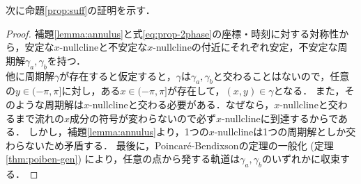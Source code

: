 \documentclass[../main]{subfiles}
\begin{document}
    次に命題\ref{prop:suff}の証明を示す．
    \begin{proof}
        補題\ref{lemma:annulus}と式\eqref{eq:prop-2phase}の座標・時刻に対する対称性から，安定な$x$-nullclineと不安定な$x$-nullclineの付近にそれぞれ安定，不安定な周期解$\gamma_a,\gamma_b$を持つ．\\
        他に周期解$\gamma$が存在すると仮定すると，$\gamma$は$\gamma_a,\gamma_b$と交わることはないので，任意の$y\in(-\pi,\pi]$に対し，ある$x\in(-\pi,\pi]$が存在して，$(x,y)\in\gamma$となる．
        また，そのような周期解は$x$-nullclineと交わる必要がある．なぜなら，$x$-nullclineと交わるまで流れの$x$成分の符号が変わらないので必ず$x$-nullclineに到達するからである．
        しかし，補題\ref{lemma:annulus}より，1つの$x$-nullclineは1つの周期解としか交わらないため矛盾する．
        最後に，Poincar\'{e}-Bendixsonの定理の一般化 (定理\ref{thm:poiben-gen}) により，任意の点から発する軌道は$\gamma_a,\gamma_b$のいずれかに収束する．
    \end{proof}
\end{document}
